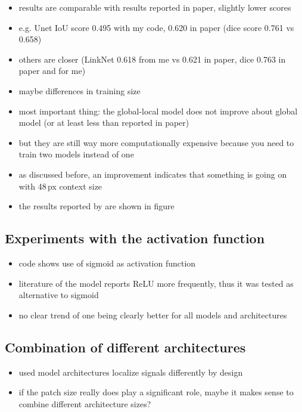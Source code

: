\begin{itemize}
	\item results are comparable with results reported in paper, slightly lower scores
	\item e.g. Unet IoU score 0.495 with my code, 0.620 in paper (dice score 0.761 vs 0.658)
	\item others are closer (LinkNet 0.618 from me vs 0.621 in paper, dice 0.763 in paper and for me)
	\item maybe differences in training size
	\item most important thing: the global-local model does not improve about global model (or at least less than reported in paper)
	\item but they are still way more computationally expensive because you need to train two models instead of one
	\item as discussed before, an improvement indicates that something is going on with 48\,px context size
	\item the results reported by \citeauthor{Oota_2023_WACV} are shown in figure
\end{itemize}

\subsection{Experiments with the activation function}

\begin{itemize}
	\item code shows use of sigmoid as activation function
	\item literature of the model reports ReLU more frequently, thus it was tested as alternative to sigmoid
	\item no clear trend of one being clearly better for all models and architectures
\end{itemize}

\subsection{Combination of different architectures}

\begin{itemize}
	\item used model architectures localize signals differently by design
	\item if the patch size really does play a significant role, maybe it makes sense to combine different architecture sizes?
\end{itemize}
